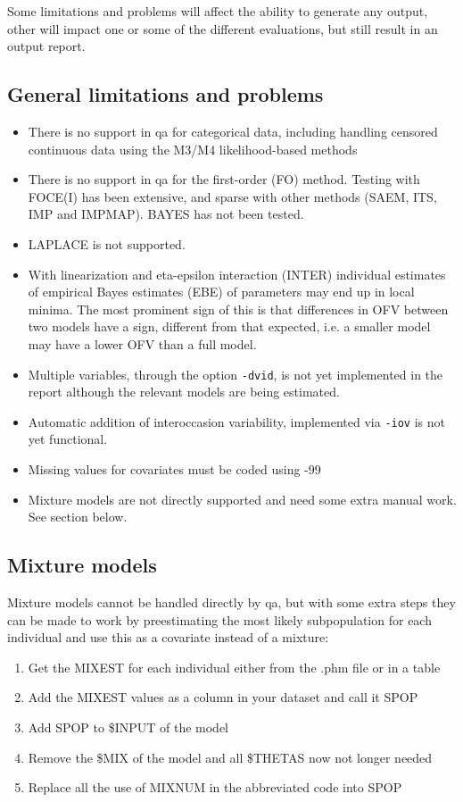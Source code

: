 Some limitations and problems will affect the ability to generate any output, other will impact one or some of the different evaluations, but still result in an output report. 

\subsection{General limitations and problems}
\begin{itemize}
	\item There is no support in qa for categorical data, including handling censored continuous data using the M3/M4 likelihood-based methods
	\item There is no support in qa for the first-order (FO) method. Testing with FOCE(I) has been extensive, and sparse with other methods (SAEM, ITS, IMP and IMPMAP). BAYES has not been tested. 
    \item LAPLACE is not supported.
	\item With linearization and eta-epsilon interaction (INTER) individual estimates of empirical Bayes estimates (EBE) of parameters may end up in local minima. The most prominent sign of this is that differences in OFV between two models have a sign, different from that expected, i.e. a smaller model may have a lower OFV than a full model.
	\item Multiple variables, through the option \verb|-dvid|, is not yet implemented in the report although the relevant models are being estimated.
	\item Automatic addition of interoccasion variability, implemented via \verb|-iov| is not yet functional.
    \item Missing values for covariates must be coded using -99
    \item Mixture models are not directly supported and need some extra manual work. See section below.
\end{itemize}

\subsection{Mixture models}
Mixture models cannot be handled directly by qa, but with some extra steps they can be made to work by preestimating the most likely subpopulation for each individual and use this as a covariate instead of a mixture:
\begin{enumerate}
    \item Get the MIXEST for each individual either from the .phm file or in a table
    \item Add the MIXEST values as a column in your dataset and call it SPOP
    \item Add SPOP to \$INPUT of the model
    \item Remove the \$MIX of the model and all \$THETAS now not longer needed
    \item Replace all the use of MIXNUM in the abbreviated code into SPOP
\end{enumerate}


